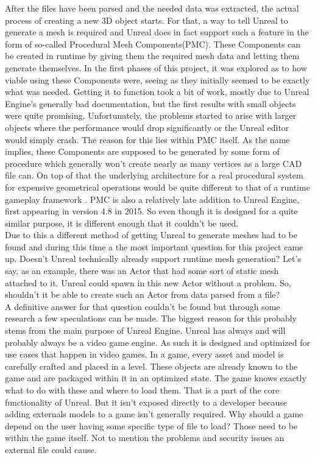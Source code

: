 After the files have been parsed and the needed data was extracted, the actual process of creating a new 3D object starts. For that, a way to tell Unreal to generate a mesh is required and Unreal does in fact support such a feature in the form of so-called Procedural Mesh Components(\acs{PMC})\cite{bib:UEPawn}. These Components can be created in runtime by giving them the required mesh data and letting them generate themselves. In the first phases of this project, it was explored as to how viable using these Components were, seeing as they initially seemed to be exactly what was needed. Getting it to function took a bit of work, mostly due to Unreal Engine's generally bad documentation, but the first results with small objects were quite promising. Unfortunately, the problems started to arise with larger objects where the performance would drop significantly or the Unreal editor would simply crash. The reason for this lies within \acs{PMC} itself. As the name implies, these Components are supposed to be generated by some form of procedure which generally won't create nearly as many vertices as a large \acs{CAD} file can. On top of that the underlying architecture for a real procedural system for expensive geometrical operations would be quite different to that of a runtime gameplay framework \cite{bib:ProcProb}. \acs{PMC} is also a relatively late addition to Unreal Engine, first appearing in version 4.8 in 2015. So even though it is designed for a quite similar purpose, it is different enough that it couldn't be used.\\
Due to this a different method of getting Unreal to generate meshes had to be found and during this time a the most important question for this project came up. Doesn't Unreal technically already support runtime mesh generation? Let's say, as an example, there was an Actor that had some sort of static mesh attached to it. Unreal could spawn in this new Actor without a problem. So, shouldn't it be able to create such an Actor from data parsed from a file?\\
A definitive answer for that question couldn't be found but through some research a few speculations can be made. The biggest reason for this probably stems from the main purpose of Unreal Engine. Unreal has always and will probably always be a video game engine. As such it is designed and optimized for use cases that happen in video games. In a game, every asset and model is carefully crafted and placed in a level. These objects are already known to the game and are packaged within it in an optimized state. The game knows exactly what to do with these and where to load them. That is a part of the core functionality of Unreal. But it isn't exposed directly to a developer because adding externals models to a game isn't generally required. Why should a game depend on the user having some specific type of file to load? Those need to be within the game itself. Not to mention the problems and security issues an external file could cause.\\
